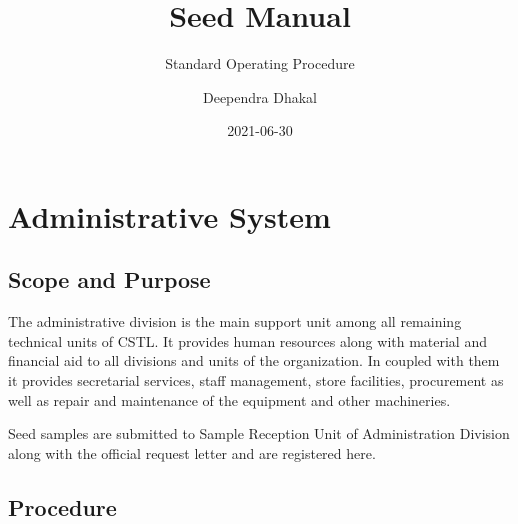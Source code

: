 \documentclass[]{book}
\title{Seed Manual}
\subtitle{Standard Operating Procedure}
\author{Deependra Dhakal}
\date{2021-06-30}
\begin{document}
\maketitle

{
\setcounter{tocdepth}{1}
\tableofcontents
}
\chapter{Administrative System}\label{adminsys}

\section{Scope and Purpose}\label{scope-and-purpose}

The administrative division is the main support unit among all remaining
technical units of CSTL. It provides human resources along with material
and financial aid to all divisions and units of the organization. In
coupled with them it provides secretarial services, staff management,
store facilities, procurement as well as repair and maintenance of the
equipment and other machineries.

Seed samples are submitted to Sample Reception Unit of Administration
Division along with the official request letter and are registered here.

\section{Procedure}\label{procedure}
\end{document}
